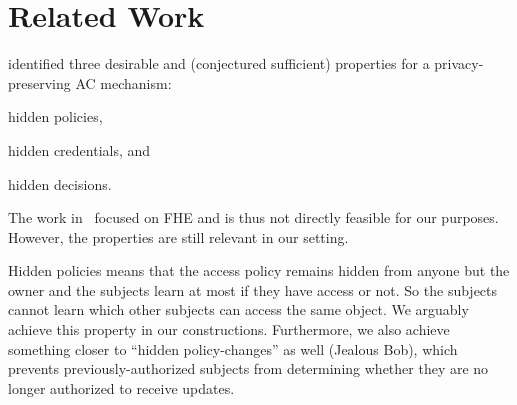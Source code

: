 






\section{Related Work}\label{RelatedWork}


\citet{TowardsPPACwHPHCHD} identified three desirable and (conjectured 
sufficient) properties for a privacy-preserving \ac{AC} mechanism:
\begin{inparablank}
\item hidden policies,
\item hidden credentials, and
\item hidden decisions.
\end{inparablank}
The work in~\cite{TowardsPPACwHPHCHD} focused on \ac{FHE} and is thus not 
directly feasible for our purposes.
However, the properties are still relevant in our setting.

Hidden policies means that the access policy remains hidden from anyone but 
the owner and the subjects learn at most if they have access or not.
So the subjects cannot learn which other subjects can access the same object.
We arguably achieve this property in our constructions.
Furthermore, we also achieve something closer to \enquote{hidden 
  policy-changes} as well (Jealous Bob), which prevents previously-authorized 
subjects from determining whether they are no longer authorized to receive 
updates.

